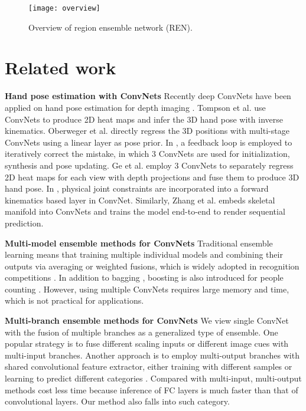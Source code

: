 \documentclass{article}
\begin{document}
\begin{figure}[htb]
\centering
{\texttt{[image: overview]}}
\caption{Overview of region ensemble network (REN).}
\label{fig_overview}
\end{figure}

\section{Related work}
\noindent\textbf{Hand pose estimation with ConvNets}\hspace{2mm} 
Recently deep ConvNets have been applied on hand pose estimation for depth imaging \cite{wang2013depth}\cite{shi2015high}. Tompson et al. \cite{tompson2014real} use ConvNets to produce 2D heat maps and infer the 3D hand pose with inverse kinematics. Oberweger et al. \cite{oberweger2015hands} directly regress the 3D positions with multi-stage ConvNets using a linear layer as pose prior. In \cite{oberwegertraining}, a feedback loop is employed to iteratively correct the mistake, in which 3 ConvNets are used for initialization, synthesis and pose updating. Ge et al. \cite{gerobust} employ 3 ConvNets to separately regress 2D heat maps for each view with depth projections and fuse them to produce 3D hand pose. In \cite{zhou2016model}, physical joint constraints are incorporated into a forward kinematics based layer in ConvNet. Similarly, Zhang et al. \cite{zhang2016learning} embeds skeletal manifold into ConvNets and trains the model end-to-end to render sequential prediction.

\noindent\textbf{Multi-model ensemble methods for ConvNets}\hspace{2mm}
Traditional ensemble learning means that training multiple individual models and combining their outputs via averaging or weighted fusions, which is widely adopted in recognition competitions \cite{krizhevsky2012imagenet}. In addition to bagging \cite{krizhevsky2012imagenet} \cite{sun2013deep}, boosting is also introduced for people counting \cite{walach2016learning}. However, using multiple ConvNets requires large memory and time, which is not practical for applications.

\noindent\textbf{Multi-branch ensemble methods for ConvNets}\hspace{2mm}
We view single ConvNet with the fusion of multiple branches as a generalized type of ensemble. One popular strategy is to fuse different scaling inputs \cite{tompson2014real} \cite{oberweger2015hands} or different image cues \cite{guo2016two} \cite{li2016deeptrack} \cite{chen2016accurate} with multi-input branches. Another approach is to employ multi-output branches with shared convolutional feature extractor, either training with different samples \cite{li2016convolutional} or learning to predict different categories \cite{ahmed2016network}. Compared with multi-input, multi-output methods cost less time because inference of FC layers is much faster than that of convolutional layers. Our method also falls into such category.
\end{document}
